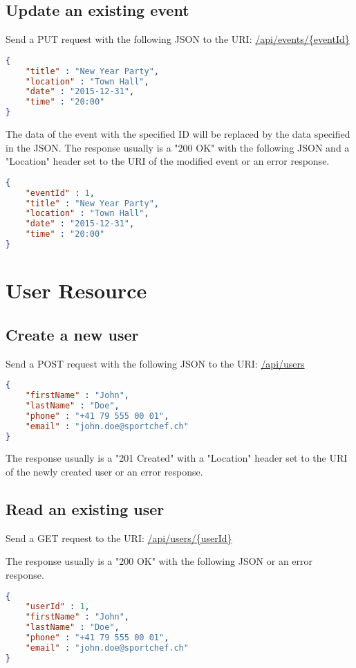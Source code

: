 \documentclass[a4paper,openright,twoside]{report}
\begin{document}
\subsection{Update an existing event}
Send a PUT request with the following JSON to the URI: \url{/api/events/{eventId}}

\begin{lstlisting}[language=json]
{
	"title" : "New Year Party",
	"location" : "Town Hall",
	"date" : "2015-12-31",
	"time" : "20:00"
}
\end{lstlisting}

The data of the event with the specified ID will be replaced by the data specified in the JSON. The response usually is a "200 OK" with the following JSON and a "Location" header set to the URI of the modified event or an error response.

\begin{lstlisting}[language=json]
{
	"eventId" : 1,
	"title" : "New Year Party",
	"location" : "Town Hall",
	"date" : "2015-12-31",
	"time" : "20:00"
}
\end{lstlisting}

\section{User Resource}

\subsection{Create a new user}
Send a POST request with the following JSON to the URI: \url{/api/users}

\begin{lstlisting}[language=json]
{
	"firstName" : "John",
	"lastName" : "Doe",
	"phone" : "+41 79 555 00 01",
	"email" : "john.doe@sportchef.ch"
}
\end{lstlisting}

The response usually is a "201 Created" with a "Location" header set to the URI of the newly created user or an error response.

\subsection{Read an existing user}
Send a GET request to the URI: \url{/api/users/{userId}}

The response usually is a "200 OK" with the following JSON or an error response.

\begin{lstlisting}[language=json]
{
	"userId" : 1,
	"firstName" : "John",
	"lastName" : "Doe",
	"phone" : "+41 79 555 00 01",
	"email" : "john.doe@sportchef.ch"
}
\end{lstlisting}
\end{document}
